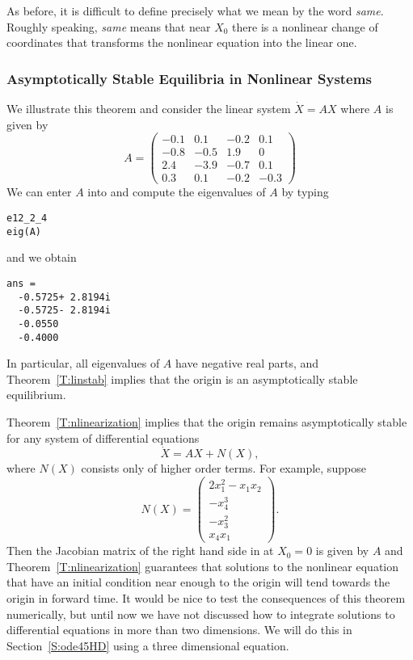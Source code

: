 As before, it is difficult to define precisely what we mean by the word
{\em same\/}. Roughly speaking, {\em same\/} means that near $X_0$ there 
is a nonlinear change of coordinates
that transforms the nonlinear equation into the linear one.

\subsubsection*{Asymptotically Stable Equilibria in Nonlinear Systems}

We illustrate this theorem and consider the linear system 
$\dot{X}=AX$ where $A$ is given by
\begin{equation*}  \label{eq:fexam4}
A = 
\left(\begin{array}{rrrr}
   -0.1 &  0.1 & -0.2 &  0.1\\
   -0.8 & -0.5 &  1.9 &    0\\
    2.4 & -3.9 & -0.7 &  0.1\\
    0.3 &  0.1 & -0.2 & -0.3
\end{array}\right)
\end{equation*}
We can enter $A$ into \Matlab and compute the eigenvalues of $A$ by typing 
\begin{verbatim}
e12_2_4
eig(A)
\end{verbatim}
and we obtain
\begin{verbatim}
ans =
  -0.5725+ 2.8194i
  -0.5725- 2.8194i
  -0.0550         
  -0.4000         
\end{verbatim}
In particular, all eigenvalues of $A$ have negative real parts, and 
Theorem~\ref{T:linstab} implies that the origin is an asymptotically 
stable equilibrium.

Theorem~\ref{T:nlinearization} implies that the origin remains
asymptotically stable for any system of differential equations
\begin{equation} \label{e:fnonlin}
\dot{X} = AX + N(X),
\end{equation}
where $N(X)$ consists only of higher order terms.  For example, suppose
\begin{equation}  \label{E:fnonlin1}
N(X) = \left(\begin{array}{c} 2x_1^2-x_1x_2 \\ -x_4^3 \\  -x_3^2 \\ x_4x_1
\end{array} \right).
\end{equation}
Then the Jacobian matrix of the right hand side in  at $X_0 = 0$ 
is given by $A$ and Theorem~\ref{T:nlinearization} guarantees that solutions to 
the nonlinear equation  that have an initial condition near 
enough to the origin will tend towards the origin in forward time.  It would be 
nice to test the consequences of this theorem numerically, but until now we
have not discussed how to integrate solutions to differential equations in
more than two dimensions.  We will do this in Section~\ref{S:ode45HD} using a 
three dimensional equation. 

